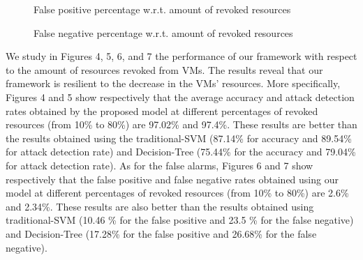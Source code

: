 \documentclass[twocolumn]{bmcart}%
\begin{document}
\begin{figure}[!ht]
    \label{fig1}
    \caption{False positive percentage w.r.t. amount of revoked resources}
\end{figure}
\begin{figure}[!ht]
    \label{fig1}
    \caption{False negative percentage w.r.t. amount of revoked resources}
\end{figure}


We study in Figures 4, 5, 6, and 7 the performance of our framework with respect to the amount of resources revoked from VMs. The results reveal that our framework is resilient to the decrease in the VMs' resources. More specifically, Figures 4 and 5 show respectively that the average accuracy and attack detection rates obtained by the proposed model at different percentages of revoked resources (from 10\% to 80\%) are 97.02\% and 97.4\%. These results are better than the results obtained using the traditional-SVM (87.14\% for accuracy and 89.54\% for attack detection rate) and Decision-Tree (75.44\% for the accuracy and 79.04\% for attack detection rate). As for the false alarms, Figures 6 and 7 show respectively that the false positive and false negative rates obtained using our model at different percentages of revoked resources (from 10\% to 80\%) are 2.6\% and 2.34\%. These results are also better than the results obtained using  traditional-SVM (10.46 \% for the false positive and 23.5 \% for the false negative) and Decision-Tree (17.28\% for the false positive and 26.68\% for the false negative).
\end{document}

